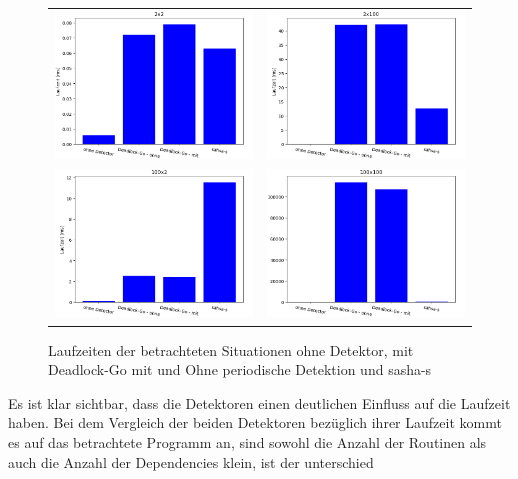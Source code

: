 \begin{figure}[H]
\begin{tabular}{cc}
    \includegraphics[width=.4\textwidth]{img/2x2.png} & \includegraphics[width=.4\textwidth]{img/2x100.png}\\
    \includegraphics[width=.4\textwidth]{img/100x2.png} & \includegraphics[width=.4\textwidth]{img/100x100.png}\\
\end{tabular}
\caption{Laufzeiten der betrachteten Situationen ohne Detektor, mit Deadlock-Go mit und Ohne periodische Detektion und sasha-s}
\end{figure}
Es ist klar sichtbar, dass die Detektoren einen deutlichen Einfluss auf 
die Laufzeit haben. Bei dem Vergleich der beiden Detektoren bezüglich ihrer 
Laufzeit kommt es auf das betrachtete Programm an, sind sowohl die Anzahl 
der Routinen als auch die Anzahl der Dependencies klein, ist der unterschied
